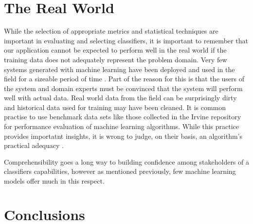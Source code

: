 \documentclass[10pt]{unbthesis}
\begin{document}
\section*{The Real World}
While the selection of appropriate metrics and statistical techniques
are important in evaluating and selecting classifiers, it is important
to remember that our application cannot be expected to perform well in
the real world if the training data does not adequately represent the
problem domain. Very few systems generated with machine learning have
been deployed and used in the field for a sizeable period of time
\cite{RefWorks:46}. Part of the reason for this is that the users of
the system and domain experts must be convinced that the system will
perform well with actual data. Real world data from the field can be
surprisingly dirty \cite{RefWorks:58} and historical data used for
training may have been cleaned. It is common practise to use benchmark
data sets like those collected in the Irvine repository
\cite{RefWorks:59} for performance evaluation of machine learning
algorithms. While this practice provides importatnt insights, it is
wrong to judge, on their basis, an algorithm's practical adequacy
\cite{RefWorks:46}.

Comprehensibility goes a long way to building confidence among
stakeholders of a classifiers capabilities, however as mentioned
previously, few machine learning models offer much in this respect.

\section*{Conclusions}


\renewcommand{\bibname}{References}



\end{document}
